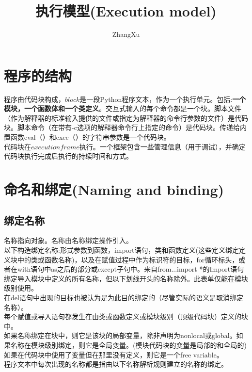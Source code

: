 \documentclass[10pt,UTF8]{ctexart}
\title{执行模型(Execution model)}
\author{ZhangXu}
\begin{document}
\maketitle
\section{程序的结构}
程序由代码块构成，$\mathit{block}$是一段Python程序文本，作为一个执行单元。包括:\textbf{一个模块，一个函数体和一个类定义}。交互式输入的每个命令都是一个块。脚本文件（作为解释器的标准输入提供的文件或指定为解释器的命令行参数的文件）是代码块。脚本命令（在带有-c选项的解释器命令行上指定的命令）是代码块。传递给内置函数eval（）和exec（）的字符串参数是一个代码块。\\
\indent 代码块在$\mathit{execution frame}$执行。一个框架包含一些管理信息（用于调试），并确定代码块执行完成后执行的持续时间和方式。
\section{命名和绑定(Naming and binding)}
\subsection{绑定名称}
名称指向对象。名称由名称绑定操作引入。\\
\indent 以下构造绑定名称:形式参数到函数，import语句，类和函数定义(这些定义绑定定义块中的类或函数名称)，以及在赋值过程中作为标识符的目标，for循环标头，或者在with语句中as之后的部分或except子句中。来自from...import *的Import语句绑定导入模块中定义的所有名称，但以下划线开头的名称除外。此表单仅能在模块级别使用。\\
\indent 在del语句中出现的目标也被认为是为此目的绑定的（尽管实际的语义是取消绑定名称）。\\
\indent 每个赋值或导入语句都发生在由类或函数定义或模块级别（顶级代码块）定义的块中。\\
\indent 如果名称绑定在块中，则它是该块的局部变量，除非声明为nonlocal或global。如果名称在模块级别绑定，则它是全局变量。(模块代码块的变量是局部的和全局的)如果在代码块中使用了变量但在那里没有定义，则它是一个free variable。\\
\indent 程序文本中每次出现的名称都是指由以下名称解析规则建立的名称的绑定。
\end{document}

